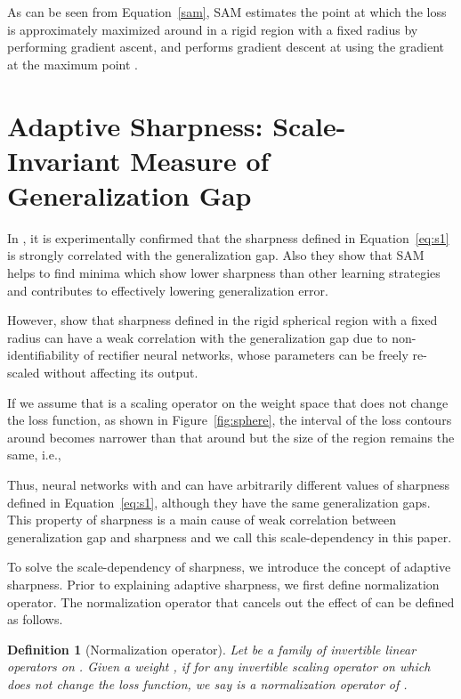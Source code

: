 \documentclass{article}
\newtheorem{defi}{Definition}
\begin{document}
\noindent As can be seen from Equation~\ref{sam}, SAM estimates the point  at which the loss is approximately maximized around  in a rigid region with a fixed radius by performing gradient ascent, and performs gradient descent at  using the gradient at the maximum point .


\section{Adaptive Sharpness: Scale-Invariant Measure of Generalization Gap} \label{sec:as}

In \citet{foret2021sharpnessaware}, it is experimentally confirmed that the sharpness defined in Equation~\ref{eq:s1} is strongly correlated with the generalization gap. Also they show that SAM helps to find minima which show lower sharpness than other learning strategies and contributes to effectively lowering generalization error.

However, \citet{dinh2017sharp} show that sharpness defined in the rigid spherical region with a fixed radius can have a weak correlation with the generalization gap due to non-identifiability of rectifier neural networks, whose parameters can be freely re-scaled without affecting its output. 

If we assume that  is a scaling operator on the weight space that does not change the loss function, as shown in Figure~\ref{fig:sphere}, the interval of the loss contours around  becomes narrower than that around  but the size of the region remains the same, i.e.,


Thus, neural networks with  and  can have arbitrarily different values of sharpness defined in Equation~\ref{eq:s1}, although they have the same generalization gaps. This property of sharpness is a main cause of weak correlation between generalization gap and sharpness and we call this scale-dependency in this paper.

To solve the scale-dependency of sharpness, we introduce the concept of adaptive sharpness. Prior to explaining adaptive sharpness, we first define normalization operator. The normalization operator that cancels out the effect of  can be defined as follows.


\begin{defi}[Normalization operator]\label{norm_op}
	Let  be a family of invertible linear operators on .
	Given a weight , if  for any invertible scaling operator  on  which does not change the loss function, we say  is a normalization operator of .
\end{defi}
\end{document}
